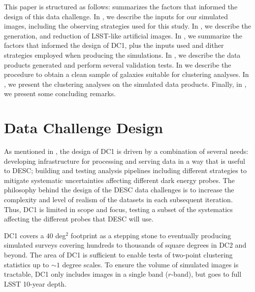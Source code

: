 \documentclass[\docopts]{\docclass}
\begin{document}
This paper is structured as follows:  summarizes the factors that informed
the design of this data challenge.  In , we describe the inputs for our simulated images, including the observing strategies used for this study. In , we describe the  generation, and reduction of LSST-like artificial images. In , we summarize the factors that informed the design of DC1, plus the inputs used and dither strategies employed when producing the simulations. In , we describe the data products generated and perform several validation tests. In  we describe the procedure to obtain a clean sample of galaxies suitable for clustering analyses. In , we present the clustering analyses on the simulated data products. Finally, in , we present some concluding remarks.

\section{Data Challenge Design}
\label{sec:design}

As mentioned in , the design of DC1 is driven by a
combination of several needs: developing infrastructure for processing and serving data in a way that is useful to DESC; building and testing analysis pipelines including different strategies to mitigate systematic uncertainties affecting different dark energy probes. The philosophy behind the design of the DESC data challenges is to increase the complexity and level
of realism of the datasets in each subsequent iteration. Thus, DC1 is limited in scope and focus, testing a subset of the systematics affecting the different probes that DESC will use.



DC1 covers a $40$ deg$^2$ footprint as a stepping stone to eventually producing simulated surveys covering hundreds to thousands of square degrees in DC2 and beyond.  The area of DC1 is sufficient to enable tests of
two-point clustering statistics up to $\sim 1$ degree scales.  To ensure the volume of simulated images is
tractable, DC1 only includes images in a single band ($r$-band), but goes to full LSST 10-year
depth. 
\end{document}
